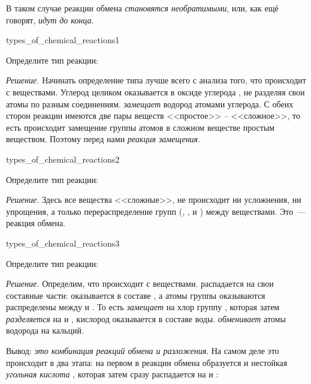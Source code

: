 
В таком случае реакции обмена \emph{становятся необратимыми}, или, как ещё говорят, \emph{идут до конца}.

\begin{example}{}{types_of_chemical_reactions1}
    \begin{condition}
        Определите тип реакции:
    \end{condition}

    \medskip

    \textit{Решение.} Начинать определение типа лучше всего с анализа того, что происходит с веществами. Углерод целиком оказывается в оксиде углерода , не разделяя свои атомы по разным соединениям.  \emph{замещает} водород атомами углерода. С обеих сторон реакции имеются две пары веществ <<простое>> -- <<сложное>>, то есть происходит замещение группы атомов в сложном веществе простым веществом. Поэтому перед нами \emph{реакция замещения}.
\end{example}

\begin{example}{}{types_of_chemical_reactions2}
    \begin{condition}
        Определите тип реакции:
    \end{condition}

    \medskip

    \textit{Решение.} Здесь все вещества <<сложные>>, не происходит ни усложнения, ни упрощения, а только перераспределение групп (, ,  и ) между веществами. Это~--- реакция обмена.
\end{example}

\begin{example}{}{types_of_chemical_reactions3}
    \begin{condition}
        Определите тип реакции:
    \end{condition}

    \medskip

    \textit{Решение.} Определим, что происходит с веществами.  распадается на свои составные части:  оказывается в составе , а атомы группы  оказываются распределены между  и . То есть  \emph{замещает} на хлор группу , которая затем \emph{разделяется} на  и , кислород оказывается в составе воды.  \emph{обменивает} атомы водорода на кальций.

    \medskip

    Вывод: \emph{это комбинация реакций обмена и разложения}. На самом деле это происходит в два этапа: на первом в реакции обмена образуется  и нестойкая \emph{угольная кислота} , которая затем сразу распадается на  и :
\end{example}

